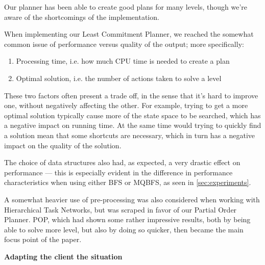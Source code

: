 \documentclass[Main]{subfiles}
\begin{document}
Our planner has been able to create good plans for many levels, though we're aware of the shortcomings of the implementation.




When implementing our Least Commitment Planner, we reached the somewhat common issue of performance versus quality of the output; more specifically:

\begin{enumerate}
	\item Processing time, i.e. how much CPU time is needed to create a plan
	\item Optimal solution, i.e. the number of actions taken to solve a level
\end{enumerate}

These two factors often present a trade off, in the sense that it's hard to improve one, without negatively affecting the other. 
For example, trying to get a more optimal solution typically cause more of the state space to be searched, which has a negative impact on running time.
At the same time would trying to quickly find a solution mean that some shortcuts are necessary, which in turn has a negative impact on the quality of the solution.

The choice of data structures also had, as expected, a very drastic effect on performance ---
this is especially evident in the difference in performance characteristics when using either BFS or MQBFS, as seen in \autoref{sec:experiments}.

A somewhat heavier use of pre-processing was also considered when working with Hierarchical Task Networks, but was scraped in favor of our Partial Order Planner. 
POP, which had shown some rather impressive results, both by being able to solve more level, but also by doing so quicker, then became the main focus point of the paper.


\textbf{Adapting the client the situation}
\end{document}
